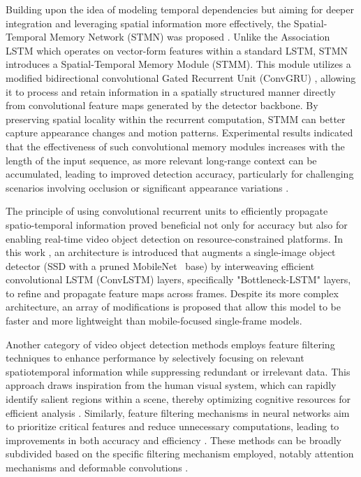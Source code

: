Building upon the idea of modeling temporal dependencies but aiming for deeper integration and leveraging spatial information more effectively, the Spatial-Temporal Memory Network (STMN) was proposed \cite{xiaoVideoObjectDetection2018}. Unlike the Association LSTM which operates on vector-form features within a standard LSTM, STMN introduces a Spatial-Temporal Memory Module (STMM). This module utilizes a modified bidirectional convolutional Gated Recurrent Unit (ConvGRU) \cite{ballasDelvingDeeperConvolutional2016}, allowing it to process and retain information in a spatially structured manner directly from convolutional feature maps generated by the detector backbone. By preserving spatial locality within the recurrent computation, STMM can better capture appearance changes and motion patterns. Experimental results indicated that the effectiveness of such convolutional memory modules increases with the length of the input sequence, as more relevant long-range context can be accumulated, leading to improved detection accuracy, particularly for challenging scenarios involving occlusion or significant appearance variations \cite{xiaoVideoObjectDetection2018}.

The principle of using convolutional recurrent units to efficiently propagate spatio-temporal information proved beneficial not only for accuracy but also for enabling real-time video object detection on resource-constrained platforms. In this work \cite{liuMobileVideoObject2018}, an architecture is introduced that augments a single-image object detector (SSD with a pruned MobileNet~\cite{howardMobileNetsEfficientConvolutional2017} base) by interweaving efficient convolutional LSTM (ConvLSTM) \cite{shiConvolutionalLSTMNetwork2015} layers, specifically "Bottleneck-LSTM" layers, to refine and propagate feature maps across frames. Despite its more complex architecture, an array of modifications is proposed that allow this model to be faster and more lightweight than mobile-focused single-frame models.


Another category of video object detection methods employs feature filtering techniques to enhance performance by selectively focusing on relevant spatiotemporal information while suppressing redundant or irrelevant data. This approach draws inspiration from the human visual system, which can rapidly identify salient regions within a scene, thereby optimizing cognitive resources for efficient analysis \cite{ittiModelSaliencybasedVisual1998}. Similarly, feature filtering mechanisms in neural networks aim to prioritize critical features and reduce unnecessary computations, leading to improvements in both accuracy and efficiency \cite{jiaoNewGenerationDeep2022}. These methods can be broadly subdivided based on the specific filtering mechanism employed, notably attention mechanisms \cite{bahdanauNeuralMachineTranslation2016a, vaswaniAttentionAllYou2023} and deformable convolutions \cite{daiDeformableConvolutionalNetworks2017a}.

